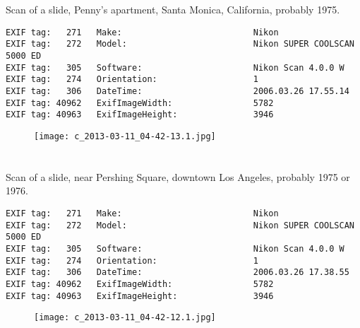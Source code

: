 \section{\protect{}}
\noindent Scan of a slide, Penny's apartment, Santa Monica, California, probably 1975.
\noindent
\begin{lstlisting}
EXIF tag:   271   Make:                          Nikon
EXIF tag:   272   Model:                         Nikon SUPER COOLSCAN 5000 ED
EXIF tag:   305   Software:                      Nikon Scan 4.0.0 W
EXIF tag:   274   Orientation:                   1
EXIF tag:   306   DateTime:                      2006.03.26 17.55.14
EXIF tag: 40962   ExifImageWidth:                5782
EXIF tag: 40963   ExifImageHeight:               3946

\end{lstlisting}
\clearpage
\begin{figure}
\raggedleft
\texttt{[image: c\_2013-03-11\_04-42-13.1.jpg]}
\end{figure}


\clearpage
\section{\protect{}}
\noindent Scan of a slide, near Pershing Square, downtown Los Angeles, probably 1975 or 1976.
\noindent
\begin{lstlisting}
EXIF tag:   271   Make:                          Nikon
EXIF tag:   272   Model:                         Nikon SUPER COOLSCAN 5000 ED
EXIF tag:   305   Software:                      Nikon Scan 4.0.0 W
EXIF tag:   274   Orientation:                   1
EXIF tag:   306   DateTime:                      2006.03.26 17.38.55
EXIF tag: 40962   ExifImageWidth:                5782
EXIF tag: 40963   ExifImageHeight:               3946

\end{lstlisting}
\clearpage
\begin{figure}
\raggedleft
\texttt{[image: c\_2013-03-11\_04-42-12.1.jpg]}
\end{figure}


\clearpage
